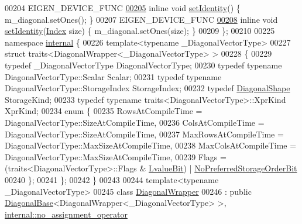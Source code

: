 \begin{DoxyCode}
00204     EIGEN\_DEVICE\_FUNC
\hyperlink{group___core___module_a4d52100471c1212cbaba950b0c39f8c9}{00205}     \textcolor{keyword}{inline} \textcolor{keywordtype}{void} \hyperlink{group___core___module_a4d52100471c1212cbaba950b0c39f8c9}{setIdentity}() \{ m\_diagonal.setOnes(); \}
00207     EIGEN\_DEVICE\_FUNC
\hyperlink{group___core___module_ae0cb9721da2963320857ec4b64eed1ea}{00208}     \textcolor{keyword}{inline} \textcolor{keywordtype}{void} \hyperlink{group___core___module_ae0cb9721da2963320857ec4b64eed1ea}{setIdentity}(\hyperlink{group___core___module_a554f30542cc2316add4b1ea0a492ff02}{Index} size) \{ m\_diagonal.setOnes(size); \}
00209 \};
00210 
00225 \textcolor{keyword}{namespace }\hyperlink{namespaceinternal}{internal} \{
00226 \textcolor{keyword}{template}<\textcolor{keyword}{typename} \_DiagonalVectorType>
00227 \textcolor{keyword}{struct }traits<DiagonalWrapper<\_DiagonalVectorType> >
00228 \{
00229   \textcolor{keyword}{typedef} \_DiagonalVectorType DiagonalVectorType;
00230   \textcolor{keyword}{typedef} \textcolor{keyword}{typename} DiagonalVectorType::Scalar Scalar;
00231   \textcolor{keyword}{typedef} \textcolor{keyword}{typename} DiagonalVectorType::StorageIndex StorageIndex;
00232   \textcolor{keyword}{typedef} \hyperlink{struct_eigen_1_1_diagonal_shape}{DiagonalShape} StorageKind;
00233   \textcolor{keyword}{typedef} \textcolor{keyword}{typename} traits<DiagonalVectorType>::XprKind XprKind;
00234   \textcolor{keyword}{enum} \{
00235     RowsAtCompileTime = DiagonalVectorType::SizeAtCompileTime,
00236     ColsAtCompileTime = DiagonalVectorType::SizeAtCompileTime,
00237     MaxRowsAtCompileTime = DiagonalVectorType::MaxSizeAtCompileTime,
00238     MaxColsAtCompileTime = DiagonalVectorType::MaxSizeAtCompileTime,
00239     Flags =  (traits<DiagonalVectorType>::Flags & \hyperlink{group__flags_gae2c323957f20dfdc6cb8f44428eaec1a}{LvalueBit}) | 
      \hyperlink{group__flags_ga3c186ad80ddcf5e2ed3d7ee31cca1860}{NoPreferredStorageOrderBit}
00240   \};
00241 \};
00242 \}
00243 
00244 \textcolor{keyword}{template}<\textcolor{keyword}{typename} \_DiagonalVectorType>
00245 \textcolor{keyword}{class }\hyperlink{group___core___module_class_eigen_1_1_diagonal_wrapper}{DiagonalWrapper}
00246   : \textcolor{keyword}{public} \hyperlink{class_eigen_1_1_diagonal_base}{DiagonalBase}<DiagonalWrapper<\_DiagonalVectorType> >, 
      \hyperlink{class_eigen_1_1internal_1_1no__assignment__operator}{internal::no\_assignment\_operator}

\end{DoxyCode}
